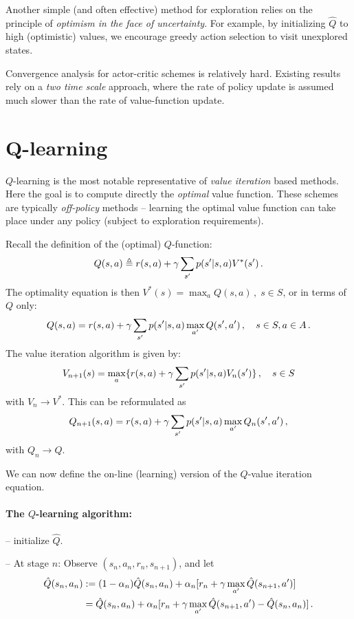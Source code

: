 Another simple (and often effective) method for exploration relies
on the principle of {\em optimism in the face of uncertainty}.
For example, by initializing $\hat Q$ to high (optimistic) values,
we encourage greedy action selection to visit unexplored
states. %



Convergence analysis for actor-critic schemes is relatively hard.
Existing results rely on a {\em two time scale} approach, where
the rate of policy update is assumed much slower than the
rate of value-function update.



\section{Q-learning}

$Q$-learning is the most notable representative of
{\em value iteration} based methods.
Here the goal is to compute directly the {\em optimal} value function.
These schemes are typically {\em off-policy} methods -- learning
the optimal value function can take place under any policy (subject to
exploration requirements).

Recall the definition of the (optimal) $Q$-function:
$$
Q(s,a) \triangleq r(s,a) + \gamma \sum_{s'} p(s'|s,a) V^* (s')\,.
$$
The optimality equation is then $V^*(s)=\max_a Q(s,a)\,,\; s\in S$,
or in terms of $Q$ only:
$$
Q(s,a) = r(s,a) + \gamma \sum_{s'} p(s' |s,a) \max_{a'} Q(s',a')\,,\quad
s\in S, a\in A \,.
$$
The value iteration algorithm is given by:
$$
V_{n+1}(s) = \max_a \{ r(s,a) +  \gamma \sum_{s'} p(s'|s,a) V_n (s') \}\,, \quad s\in S
$$
with $V_n\to V^*$. This can be reformulated as
\begin{equation}
\label{star} Q_{n+1} (s,a) = r(s,a) +\gamma \sum_{s'} p(s'|s,a)
\max_{a'} Q_n (s',a')\,,
\end{equation}
with $Q_n\to Q$.

We can now define the on-line (learning) version of the $Q$-value iteration
equation.

\paragraph{The $Q$-learning algorithm:}

-- initialize $\hat Q$.

-- At stage $n$: Observe $(s_n,a_n,r_n,s_{n+1})$, and let
\begin{align*}
\hat Q(s_n,a_n) & := (1-\alpha_n) \hat Q (s_n,a_n) + \alpha_n [r_n + \gamma \max_{a'} \hat {Q}
(s_{n+1}, a') ] \\
& = \hat {Q} (s_n,a_n) + \alpha_n [r_n + \gamma \max_{a'} \hat {Q} (s_{n+1},a')
- \hat{Q} (s_n,a_n)]
\,.
\end{align*}

